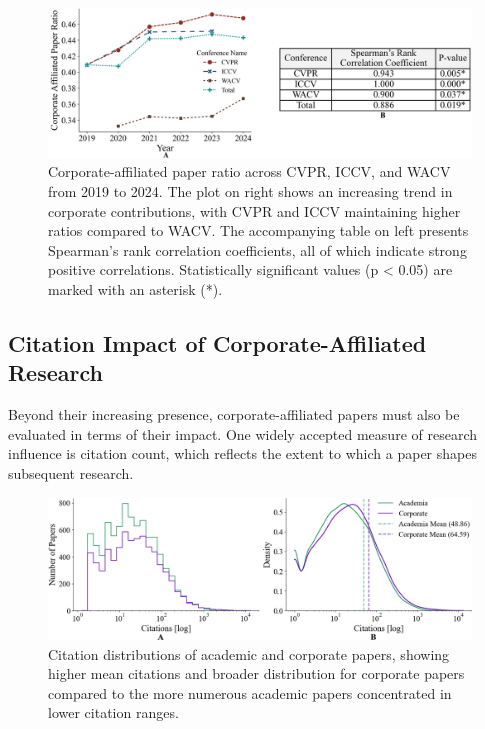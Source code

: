 \documentclass{article}
\begin{document}
\begin{figure}[ht]
    \centering
    \includegraphics[width=0.9\linewidth]{report/images/corporate_ratio_table.png}
    \caption{Corporate-affiliated paper ratio across CVPR, ICCV, and WACV from 2019 to 2024. The plot on right shows an increasing trend in corporate contributions, with CVPR and ICCV maintaining higher ratios compared to WACV. The accompanying table on left presents Spearman’s rank correlation coefficients, all of which indicate strong positive correlations. Statistically significant values (p < 0.05) are marked with an asterisk (*).}
    \label{fig:corporate_ratio_graph}
\end{figure}
\vspace{-15pt}
\subsection{Citation Impact of Corporate-Affiliated Research}
\vspace{-7pt}
Beyond their increasing presence, corporate-affiliated papers must also be evaluated in terms of their impact. One widely accepted measure of research influence is citation count, which reflects the extent to which a paper shapes subsequent research.
\begin{figure}[ht]
    \centering
    \includegraphics[width=0.9\linewidth]{report/images/ieee_citations.png}
    \caption{Citation distributions of academic and corporate papers, showing higher mean citations and broader distribution for corporate papers compared to the more numerous academic papers concentrated in lower citation ranges.}
    \label{fig:ieee_citations}
    \vspace{-15pt}
\end{figure}
\end{document}
